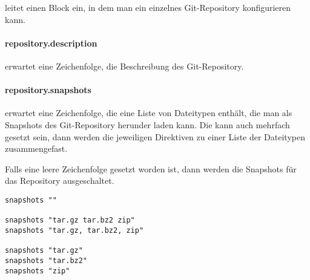  leitet einen Block ein, in dem man ein einzelnes Git-Repository konfigurieren kann.

\paragraph{repository.description}

 erwartet eine Zeichenfolge, die Beschreibung des Git-Repository.

\paragraph{repository.snapshots}

 erwartet eine Zeichenfolge, die eine Liste von Dateitypen enthält, die man als Snapshots des Git-Repository herunder laden kann. Die  kann auch mehrfach gesetzt sein, dann werden die jeweiligen Direktiven zu einer Liste der Dateitypen zusammengefast.

Falls eine leere Zeichenfolge gesetzt worden ist, dann werden die Snapshots für das Repository ausgeschaltet.

\begin{lstlisting}[style=Java, caption=Beispiele für die \directive{snapshots}]
snapshots ""

snapshots "tar.gz tar.bz2 zip"
snapshots "tar.gz, tar.bz2, zip"

snapshots "tar.gz"
snapshots "tar.bz2"
snapshots "zip"
\end{lstlisting}
